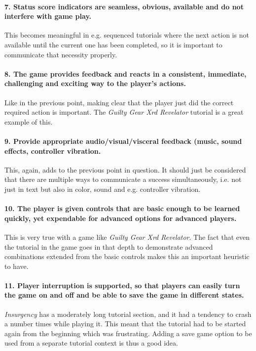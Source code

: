 \paragraph{7. Status score indicators are seamless, obvious, available and do not interfere with game play.}
This becomes meaningful in e.g. sequenced tutorials where the next action is not available until the current one has been completed, so it is important to communicate that necessity properly.

\paragraph{8. The game provides feedback and reacts in a consistent, immediate, challenging and exciting way to the player's actions.} Like in the previous point, making clear that the player just did the correct required action is important. The \textit{Guilty Gear Xrd Revelator} tutorial is a great example of this.

\paragraph{9. Provide appropriate audio/visual/visceral feedback (music, sound effects, controller vibration.} This, again, adds to the previous point in question. It should just be considered that there are multiple ways to communicate a success simultaneously, i.e. not just in text but also in color, sound and e.g. controller vibration.

\paragraph{10. The player is given controls that are basic enough to be learned quickly, yet expendable for advanced options for advanced players.} This is very true with a game like \textit{Guilty Gear Xrd Revelator}. The fact that even the tutorial in the game goes in that depth to demonstrate advanced combinations extended from the basic controls makes this an important heuristic to have.

\paragraph{11. Player interruption is supported, so that players can easily turn the game on and off and be able to save the game in different states.} \textit{Insurgency} has a moderately long tutorial section, and it had a tendency to crash a number times while playing it. This meant that the tutorial had to be started again from the beginning which was frustrating. Adding a save game option to be used from a separate tutorial context is thus a good idea.

